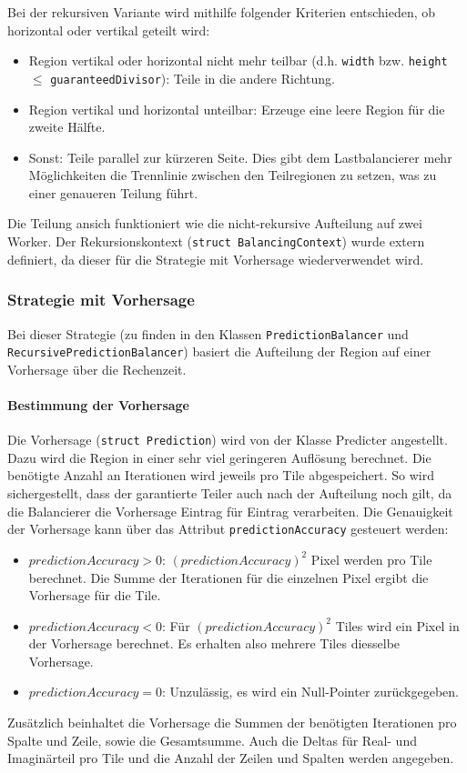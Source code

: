 Bei der rekursiven Variante wird mithilfe folgender Kriterien entschieden, ob horizontal oder vertikal geteilt wird:

\begin{itemize}
	\item Region vertikal oder horizontal nicht mehr teilbar (d.h. \verb|width| bzw. \verb|height| $\leq$ \verb|guaranteedDivisor|): Teile in die andere Richtung.
	\item Region vertikal und horizontal unteilbar: Erzeuge eine leere Region für die zweite Hälfte.
	\item Sonst: Teile parallel zur kürzeren Seite. Dies gibt dem Lastbalancierer mehr Möglichkeiten die Trennlinie zwischen den Teilregionen zu setzen, was zu einer genaueren Teilung führt.
\end{itemize}

Die Teilung ansich funktioniert wie die nicht-rekursive Aufteilung auf zwei Worker.
Der Rekursionskontext (\verb|struct BalancingContext|) wurde extern definiert, da dieser für die Strategie mit Vorhersage wiederverwendet wird.

\subsubsection{Strategie mit Vorhersage}

Bei dieser Strategie (zu finden in den Klassen \verb|PredictionBalancer| und \\ \verb|RecursivePredictionBalancer|) basiert die Aufteilung der Region auf einer Vorhersage über die Rechenzeit.

\paragraph*{Bestimmung der Vorhersage}
Die Vorhersage (\verb|struct Prediction|) wird von der Klasse Predicter angestellt.
Dazu wird die Region in einer sehr viel geringeren Auflösung berechnet.
Die benötigte Anzahl an Iterationen wird jeweils pro Tile abgespeichert.
So wird sichergestellt, dass der garantierte Teiler auch nach der Aufteilung noch gilt, da die Balancierer die Vorhersage Eintrag für Eintrag verarbeiten.
Die Genauigkeit der Vorhersage kann über das Attribut \verb|predictionAccuracy| gesteuert werden:
\begin{itemize}
	\item $predictionAccuracy > 0$: $(predictionAccuracy)^2$ Pixel werden pro Tile berechnet. Die Summe der Iterationen für die einzelnen Pixel ergibt die Vorhersage für die Tile.
	\item $predictionAccuracy < 0$: Für $(predictionAccuracy)^2$ Tiles wird ein Pixel in der Vorhersage berechnet. Es erhalten also mehrere Tiles diesselbe Vorhersage.
	\item $predictionAccuracy = 0$: Unzulässig, es wird ein Null-Pointer zurückgegeben.
\end{itemize}
Zusätzlich beinhaltet die Vorhersage die Summen der benötigten Iterationen pro Spalte und Zeile, sowie die Gesamtsumme.
Auch die Deltas für Real- und Imaginärteil pro Tile und die Anzahl der Zeilen und Spalten werden angegeben.

